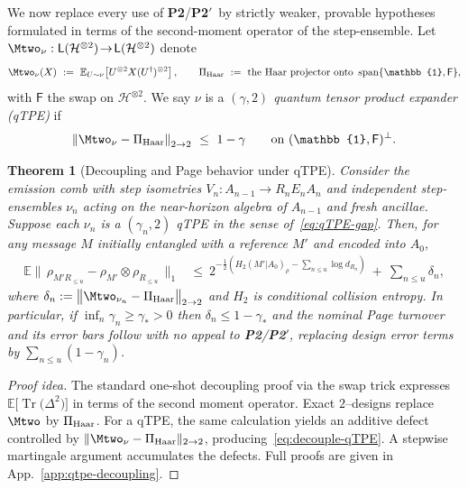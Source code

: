 \documentclass[11pt,a4paper]{article}
\newcommand{\Ptwo}{\textbf{P2}\xspace}
\newcommand{\PtwoPrime}{\textbf{P2$'$}\xspace}
\theoremstyle{plain}
\newtheorem{theorem}{Theorem}
\theoremstyle{definition}
\theoremstyle{remark}
\begin{document}
We now replace every use of \Ptwo/\PtwoPrime\ by strictly weaker, provable hypotheses formulated in terms of the second-moment operator of the step-ensemble. Let $\Mtwo_\nu:\mathsf{L}(\mathcal{H}^{\otimes 2})\!\to\!\mathsf{L}(\mathcal{H}^{\otimes 2})$ denote
\begin{equation}
\Mtwo_\nu(X)\ :=\ \mathbb{E}_{U\sim \nu}\!\left[U^{\otimes 2} X (U^\dagger)^{\otimes 2}\right],\qquad
\Pi_{\rm Haar}\ :=\ \text{the Haar projector onto }\operatorname{span}\{ \mathbb{1},\mathsf{F}\},
\end{equation}
with $\mathsf{F}$ the swap on $\mathcal{H}^{\otimes 2}$. We say $\nu$ is a \emph{$(\gamma,2)$ quantum tensor product expander (qTPE)} if
\begin{equation}\label{eq:qTPE-gap}
\left\| \Mtwo_\nu-\Pi_{\rm Haar}\right\|_{2\to 2}\ \le\ 1-\gamma\qquad\text{on }(\mathbb{1},\mathsf{F})^\perp.
\end{equation}

\begin{theorem}[Decoupling and Page behavior under qTPE]\label{thm:qtpe-page}
Consider the emission comb with step isometries $V_n:A_{n-1}\!\to\! R_n E_n A_n$ and independent step-ensembles $\nu_n$ acting on the near-horizon algebra of $A_{n-1}$ and fresh ancillae. Suppose each $\nu_n$ is a $(\gamma_n,2)$ qTPE in the sense of~\eqref{eq:qTPE-gap}. Then, for any message $M$ initially entangled with a reference $M'$ and encoded into $A_0$,
\begin{align}
\mathbb{E}\big\|\,\rho_{M' R_{\le u}}-\rho_{M'}\!\otimes\!\rho_{R_{\le u}}\,\big\|_1
&\le\ 2^{-\frac12\!\left(H_2(M'|A_0)_\rho-\sum_{n\le u}\!\log d_{R_n}\right)}\ +\ \sum_{n\le u}\delta_n,\label{eq:decouple-qTPE}
\end{align}
where $\delta_n:=\big\|\Mtwo_{\nu_n}-\Pi_{\rm Haar}\big\|_{2\to 2}$ and $H_2$ is conditional collision entropy. In particular, if $\inf_n\gamma_n\ge \gamma_*>0$ then $\delta_n\le 1-\gamma_*$ and the nominal Page turnover and its error bars follow with \emph{no} appeal to \Ptwo/\PtwoPrime, replacing design error terms by $\sum_{n\le u}(1-\gamma_n)$.
\end{theorem}
\begin{proof}[Proof idea]
The standard one-shot decoupling proof via the swap trick expresses $\mathbb{E}\!\big[\operatorname{Tr}\big(\Delta^2\big)\big]$ in terms of the second moment operator. Exact $2$--designs replace $\Mtwo$ by $\Pi_{\rm Haar}$. For a qTPE, the same calculation yields an additive defect controlled by $\|\Mtwo_\nu-\Pi_{\rm Haar}\|_{2\to 2}$, producing~\eqref{eq:decouple-qTPE}. A stepwise martingale argument accumulates the defects. Full proofs are given in App.~\ref{app:qtpe-decoupling}.
\end{proof}
\end{document}
